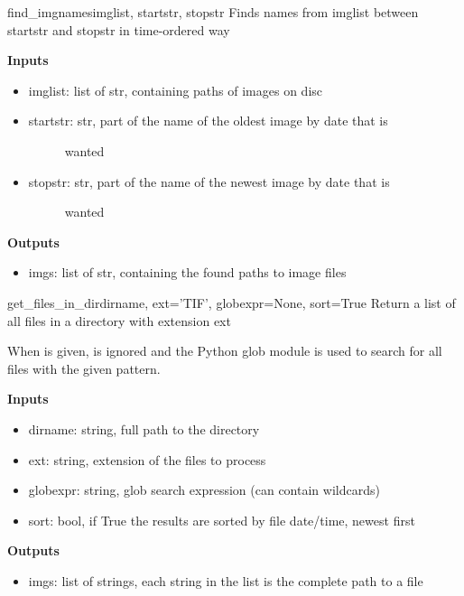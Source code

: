 \documentclass[letterpaper,10pt,english]{manual}
\begin{document}
\hypertarget{filetools.find_imgnames}{}\begin{funcdesc}{find\_imgnames}{imglist, startstr, stopstr}
Finds names from imglist between startstr and stopstr in time-ordered way

\textbf{Inputs}
\begin{itemize}
\item {} 
imglist: list of str, containing paths of images on disc

\item {} \begin{description}
\item[startstr: str, part of the name of the oldest image by date that is]
wanted

\end{description}

\item {} \begin{description}
\item[stopstr: str, part of the name of the newest image by date that is]
wanted

\end{description}

\end{itemize}

\textbf{Outputs}
\begin{itemize}
\item {} 
imgs: list of str, containing the found paths to image files

\end{itemize}
\end{funcdesc}

\hypertarget{filetools.get_files_in_dir}{}\begin{funcdesc}{get\_files\_in\_dir}{dirname, ext='TIF', globexpr=None, sort=True}
Return a list of all files in a directory with extension ext

When  is given,  is ignored and the Python glob module
is used to search for all files with the given pattern.

\textbf{Inputs}
\begin{itemize}
\item {} 
dirname: string, full path to the directory

\item {} 
ext: string, extension of the files to process

\item {} 
globexpr: string, glob search expression (can contain wildcards)

\item {} 
sort: bool, if True the results are sorted by file date/time, newest
first

\end{itemize}

\textbf{Outputs}
\begin{itemize}
\item {} 
imgs: list of strings, each string in the list is the complete path to
a file

\end{itemize}
\end{funcdesc}
\end{document}
